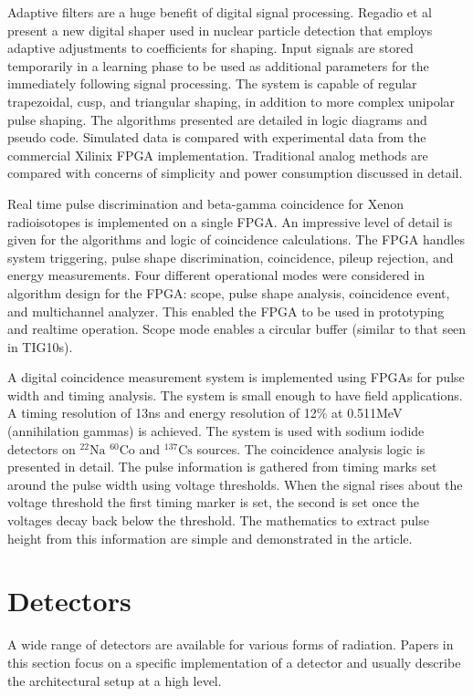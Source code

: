 \documentclass[12pt]{article}
\begin{document}
\begin{doublespacing}
{\large\textbf{\cite{Regadio2014297}}}
Adaptive filters are a huge benefit of digital signal processing.
Regadio et al present a new digital shaper used in nuclear particle detection that employs adaptive adjustments to coefficients for shaping.
Input signals are stored temporarily in a learning phase to be used as additional parameters for the immediately following signal processing.
The system is capable of regular trapezoidal, cusp, and triangular shaping, in addition to more complex unipolar pulse shaping.
The algorithms presented are detailed in logic diagrams and pseudo code.
Simulated data is compared with experimental data from the commercial Xilinix FPGA implementation.
Traditional analog methods are compared with concerns of simplicity and power consumption discussed in detail.


{\large\textbf{\cite{Farsoni201375}}}
Real time pulse discrimination and beta-gamma coincidence for Xenon radioisotopes is implemented on a single FPGA.
An impressive level of detail is given for the algorithms and logic of coincidence calculations.
The FPGA handles system triggering, pulse shape discrimination, coincidence, pileup rejection, and energy measurements.
Four different operational modes were considered in algorithm design for the FPGA: scope, pulse shape analysis, coincidence event, and multichannel analyzer.
This enabled the FPGA to be used in prototyping and realtime operation.
Scope mode enables a circular buffer (similar to that seen in TIG10s).


{\large\textbf{\cite{Zhu2011454}}}
A digital coincidence measurement system is implemented using FPGAs for pulse width and timing analysis.
The system is small enough to have field applications.
A timing resolution of 13ns and energy resolution of 12\% at 0.511MeV (annihilation gammas) is achieved.
The system is used with sodium iodide detectors on $^{22}\mbox{Na}$ $^{60}\mbox{Co}$ and $^{137}\mbox{Cs}$ sources.
The coincidence analysis logic is presented in detail.
The pulse information is gathered from timing marks set around the pulse width using voltage thresholds.
When the signal rises about the voltage threshold the first timing marker is set, the second is set once the voltages decay back below the threshold.
The mathematics to extract pulse height from this information are simple and demonstrated in the article.
\\[20pt]


\pagebreak
\section{Detectors}   %
A wide range of detectors are available for various forms of radiation.
Papers in this section focus on a specific implementation of a detector and usually describe the architectural setup at a high level.


\end{doublespacing}
\end{document}
